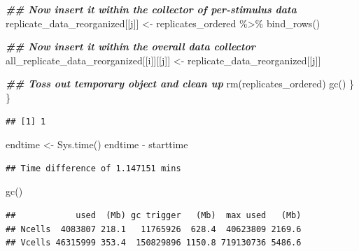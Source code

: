 \documentclass[
]{book}
\newenvironment{Shaded}{\begin{snugshade}}{\end{snugshade}}
\newcommand{\CommentTok}[1]{\textcolor[rgb]{0.56,0.35,0.01}{\textit{#1}}}
\newcommand{\ControlFlowTok}[1]{\textcolor[rgb]{0.13,0.29,0.53}{\textbf{#1}}}
\newcommand{\DecValTok}[1]{\textcolor[rgb]{0.00,0.00,0.81}{#1}}
\newcommand{\DocumentationTok}[1]{\textcolor[rgb]{0.56,0.35,0.01}{\textbf{\textit{#1}}}}
\newcommand{\FunctionTok}[1]{\textcolor[rgb]{0.00,0.00,0.00}{#1}}
\newcommand{\NormalTok}[1]{#1}
\newcommand{\OtherTok}[1]{\textcolor[rgb]{0.56,0.35,0.01}{#1}}
\newcommand{\SpecialCharTok}[1]{\textcolor[rgb]{0.00,0.00,0.00}{#1}}
\begin{document}
\begin{Shaded}
\begin{Highlighting}[]
    \DocumentationTok{\#\# Now insert it within the collector of per{-}stimulus data}
\NormalTok{    replicate\_data\_reorganized[[j]] }\OtherTok{\textless{}{-}}
\NormalTok{      replicates\_ordered }\SpecialCharTok{\%\textgreater{}\%}
      \FunctionTok{bind\_rows}\NormalTok{()}

    \DocumentationTok{\#\# Now insert it within the overall data collector}
\NormalTok{    all\_replicate\_data\_reorganized[[i]][[j]] }\OtherTok{\textless{}{-}}
\NormalTok{      replicate\_data\_reorganized[[j]]}

    \DocumentationTok{\#\# Toss out temporary object and clean up}
    \FunctionTok{rm}\NormalTok{(replicates\_ordered)}
    \FunctionTok{gc}\NormalTok{()}
\NormalTok{  \}}
\NormalTok{\}}
\end{Highlighting}
\end{Shaded}

\begin{verbatim}
## [1] 1
\end{verbatim}

\begin{Shaded}
\begin{Highlighting}[]
\NormalTok{endtime }\OtherTok{\textless{}{-}} \FunctionTok{Sys.time}\NormalTok{()}
\NormalTok{endtime }\SpecialCharTok{{-}}\NormalTok{ starttime}
\end{Highlighting}
\end{Shaded}

\begin{verbatim}
## Time difference of 1.147151 mins
\end{verbatim}

\begin{Shaded}
\begin{Highlighting}[]
\FunctionTok{gc}\NormalTok{()}
\end{Highlighting}
\end{Shaded}

\begin{verbatim}
##            used  (Mb) gc trigger   (Mb)  max used   (Mb)
## Ncells  4083807 218.1   11765926  628.4  40623809 2169.6
## Vcells 46315999 353.4  150829896 1150.8 719130736 5486.6
\end{verbatim}

\begin{Shaded}
\end{Shaded}
\end{document}
